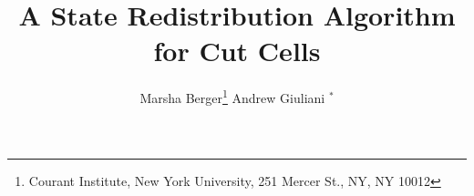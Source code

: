 \documentclass[12pt]{article}
\begin{document}
\title{A State Redistribution Algorithm for Cut Cells}
\author{Marsha Berger\footnote{Courant Institute, New York University, 251 Mercer St.,
NY, NY 10012}  \hspace{1in} Andrew Giuliani $^*$}

\maketitle

\begin{abstract}
\end{abstract}
















\end{document}

